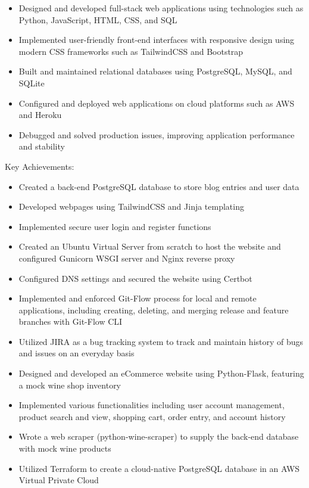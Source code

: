 \documentclass[
    10pt,
    A4,
    english,
    draft = false,
    twoside = false,
]{article}
\begin{document}
    {
    \begin{itemize}
      \item Designed and developed full-stack web applications using technologies such as Python,           JavaScript, HTML, CSS, and SQL
      \item Implemented user-friendly front-end interfaces with responsive design using modern CSS          frameworks such as TailwindCSS and Bootstrap
      \item Built and maintained relational databases using PostgreSQL, MySQL, and SQLite
      \item Configured and deployed web applications on cloud platforms such as AWS and Heroku
      \item Debugged and solved production issues, improving application performance and stability
    \end{itemize}
    {Key Achievements:}
    \begin{itemize}
      \item Created a back-end PostgreSQL database to store blog entries and user data
      \item Developed webpages using TailwindCSS and Jinja templating
      \item Implemented secure user login and register functions
      \item Created an Ubuntu Virtual Server from scratch to host the website and configured Gunicorn WSGI        server and Nginx reverse proxy
      \item Configured DNS settings and secured the website using Certbot
      \item Implemented and enforced Git-Flow process for local and remote applications, including creating, deleting, and merging release and feature branches with Git-Flow CLI
      \item Utilized JIRA as a bug tracking system to track and maintain history of bugs and issues on an everyday basis
      \item Designed and developed an eCommerce website using Python-Flask, featuring a mock wine shop inventory
      \item Implemented various functionalities including user account management, product search and view, shopping cart, order entry, and account history
      \item Wrote a web scraper (python-wine-scraper) to supply the back-end database with mock wine products
      \item Utilized Terraform to create a cloud-native PostgreSQL database in an AWS Virtual Private Cloud
    \end{itemize}
    }
\end{document}
